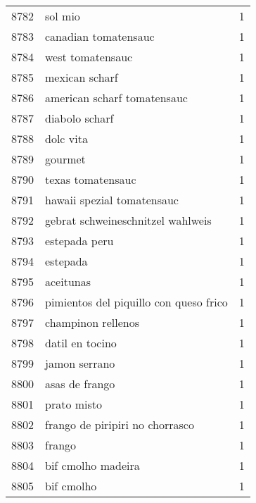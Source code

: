 \begin{tabular}{llr}
8782 &                                            sol mio &      1 \\
8783 &                               canadian tomatensauc &      1 \\
8784 &                                   west tomatensauc &      1 \\
8785 &                                     mexican scharf &      1 \\
8786 &                        american scharf tomatensauc &      1 \\
8787 &                                     diabolo scharf &      1 \\
8788 &                                          dolc vita &      1 \\
8789 &                                            gourmet &      1 \\
8790 &                                  texas tomatensauc &      1 \\
8791 &                         hawaii spezial tomatensauc &      1 \\
8792 &                  gebrat schweineschnitzel wahlweis &      1 \\
8793 &                                      estepada peru &      1 \\
8794 &                                           estepada &      1 \\
8795 &                                          aceitunas &      1 \\
8796 &             pimientos del piquillo con queso frico &      1 \\
8797 &                                 champinon rellenos &      1 \\
8798 &                                    datil en tocino &      1 \\
8799 &                                      jamon serrano &      1 \\
8800 &                                     asas de frango &      1 \\
8801 &                                        prato misto &      1 \\
8802 &                    frango de piripiri no chorrasco &      1 \\
8803 &                                             frango &      1 \\
8804 &                                 bif cmolho madeira &      1 \\
8805 &                                         bif cmolho &      1 \\

\end{tabular}
